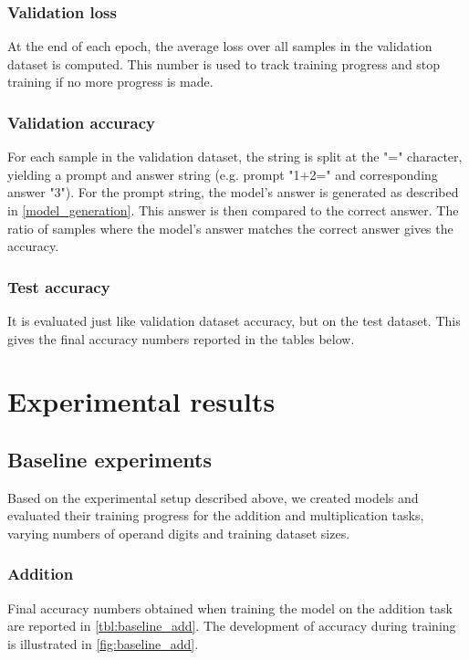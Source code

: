 \subsubsection{Validation loss}
At the end of each epoch, the average loss over all samples in the validation dataset is computed. This number is used to track training progress and stop training if no more progress is made.

\subsubsection{Validation accuracy}
For each sample in the validation dataset, the string is split at the "=" character, yielding a prompt and answer string (e.g. prompt "1+2=" and corresponding answer "3"). For the prompt string, the model's answer is generated as described in \cref{model_generation}. This answer is then compared to the correct answer. The ratio of samples where the model's answer matches the correct answer gives the accuracy.

\subsubsection{Test accuracy}
It is evaluated just like validation dataset accuracy, but on the test dataset. This gives the final accuracy numbers reported in the tables below.







\section{Experimental results}

\subsection{Baseline experiments}

Based on the experimental setup described above, we created models and evaluated their training progress for the addition and multiplication tasks, varying numbers of operand digits and training dataset sizes.

\subsubsection{Addition}

Final accuracy numbers obtained when training the model on the addition task are reported in \cref{tbl:baseline_add}. The development of accuracy during training is illustrated in \cref{fig:baseline_add}.


